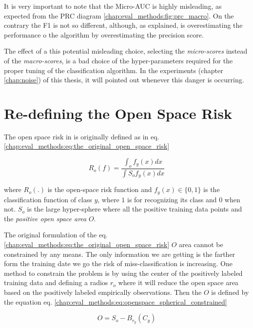 It is very important to note that the Micro-AUC is highly misleading, as expected from the PRC diagram \ref{chap:eval_methods:fig:prc_macro}. On the contrary the F1 is not so different, although, as explained, is overestimating the performance o the algorithm by overestimating the precision score. 

The effect of a this potential misleading choice, selecting the \textit{micro-scores} instead of the \textit{macro-scores}, is a bad choice of the  hyper-parameters required for the proper tuning of the classification algorithm. In the experiments (chapter \ref{chap:noise}) of this thesis, it will pointed out whenever this danger is occurring.

\section{Re-defining the Open Space Risk}\label{chap:eval_methods:sec:open_space_risk} 

The open space risk in \parencite{scheirer2013toward} is originally defined as in eq. \ref{chap:eval_methods:eq:the_original_open_space_risk}

\begin{equation}\label{chap:eval_methods:eq:the_original_open_space_risk}
	R_{o}(f) = \frac{\int_{o} f_{y}(x) dx}{\int{S_{o}}  f_{y}(x) dx}
\end{equation}

\noindent
where $R_{o}(.)$ is the open-space risk function and $f_{y}(x)  \in \{0, 1\}$ is the classification function of class $y$, where $1$ is for recognizing its class and $0$ when not. $S_{o}$ is the large hyper-sphere where all the positive training data points and the \textit{positive open space area} $O$. 

The original formulation of the eq. \ref{chap:eval_methods:eq:the_original_open_space_risk} $O$ area cannot be constrained by any means. The only information we are getting is the farther form the training date we go the risk of miss-classification is increasing. One method to constrain the problem is by using the center of the positively labeled training data and defining a radios $r_{o}$ where it will reduce the open space area based on the positively labeled empirically observations. Then the $O$ is defined by the equation eq. \ref{chap:eval_methods:eq:openspace_spherical_constrained}

\begin{equation}\label{chap:eval_methods:eq:openspace_spherical_constrained}
	O = S_{o} - B_{r_{y}}(C_{y})
\end{equation}

